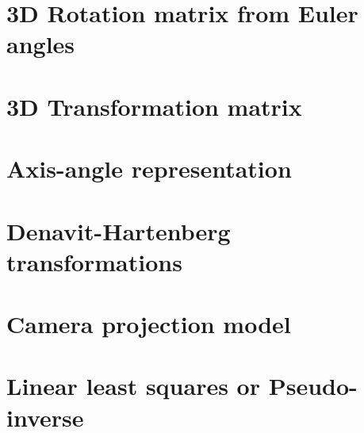 \documentclass[twocolumn]{article}
\begin{document}
\section{3D  Rotation matrix   from Euler  angles}
\section{3D  Transformation matrix}
\section{Axis-angle representation}
\section{Denavit-Hartenberg  transformations}
\section{Camera  projection model}
\section{Linear least squares  or  Pseudo-inverse}

\listoftheorems[ignoreall,show={defn}]
\end{document}
